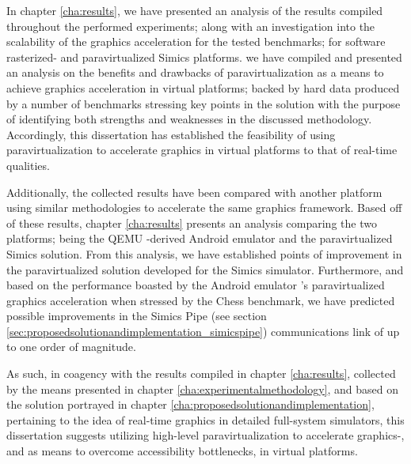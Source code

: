 In chapter \ref{cha:results}, we have presented an analysis of the results compiled throughout the performed experiments; along with an investigation into the scalability of the graphics acceleration for the tested benchmarks; for software rasterized- and paravirtualized Simics platforms.
we have compiled and presented an analysis on the benefits and drawbacks of paravirtualization as a means to achieve graphics acceleration in virtual platforms; backed by hard data produced by a number of benchmarks stressing key points in the solution with the purpose of identifying both strengths and weaknesses in the discussed methodology.
Accordingly, this dissertation has established the feasibility of using paravirtualization to accelerate graphics in virtual platforms to that of real-time qualities.

Additionally, the collected results have been compared with another platform using similar methodologies to accelerate the same graphics framework.
Based off of these results, chapter \ref{cha:results} presents an analysis comparing the two platforms; being the QEMU -derived Android emulator and the paravirtualized Simics solution.
From this analysis, we have established points of improvement in the paravirtualized solution developed for the Simics simulator.
Furthermore, and based on the performance boasted by the Android emulator 's paravirtualized graphics acceleration when stressed by the Chess benchmark, we have predicted possible improvements in the Simics Pipe (see section \ref{sec:proposedsolutionandimplementation_simicspipe}) communications link of up to one order of magnitude.

As such, in coagency with the results compiled in chapter \ref{cha:results}, collected by the means presented in chapter \ref{cha:experimentalmethodology}, and based on the solution portrayed in chapter \ref{cha:proposedsolutionandimplementation}, pertaining to the idea of real-time graphics in detailed full-system simulators, this dissertation suggests utilizing high-level paravirtualization to accelerate graphics-, and as means to overcome accessibility bottlenecks, in virtual platforms.
